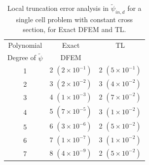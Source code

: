 \begin{table}[!hbp]
\centering
\caption{Local truncation error analysis in $\widetilde{\psi}_{in,d}$ for a single cell problem with constant cross section, for Exact DFEM and TL. }
\begin{tabular}{|c|c|c|} 
\hline
  Polynomial 										  & Exact 										&	 TL                   \\
  Degree  of $\widetilde{\psi}$		&   DFEM										& {}	                  \\
	\hline
				1   											&  2 $(2\times 10^{-1})$		& 2 $(5\times 10^{-1})$		\\
		\hline
				2   											&  3  $(2\times 10^{-2})$		&	3 $(4\times 10^{-2})$	\\
		\hline	
				3   											&  4 $(1\times 10^{-3})$		& 2 $(7\times 10^{-2})$	\\
		\hline
				4   											&  5 $(7\times 10^{-5})$		& 3 $(1\times 10^{-2})$	\\
		\hline	
				5   											&  6 $(3\times 10^{-6})$		& 2 $(5\times 10^{-2})$	\\
		\hline		
				6   											&  7 $(1\times 10^{-7})$		& 3 $(1\times 10^{-2})$	\\
		\hline		
				7   											&  8 $(4\times 10^{-9})$		& 2 $(5\times 10^{-2})$	\\
		\hline		
\end{tabular}
\label{tbl:taylor_in_part1} 
\end{table}

